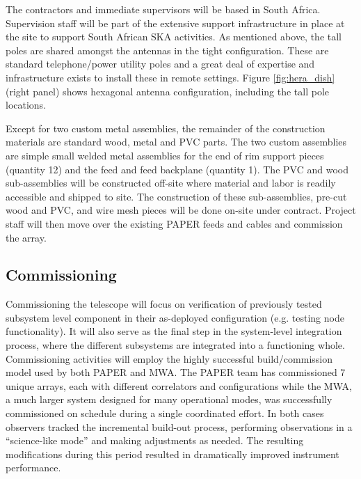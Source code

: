 \documentclass[preprint]{aastex}
\begin{document}
The contractors and immediate supervisors will be based in South Africa.  Supervision staff 
will be part of the extensive support infrastructure in place at the site to support South African SKA activities.
As mentioned above, the tall poles are shared amongst the antennas in the tight configuration.  
These are standard telephone/power 
utility poles and a great deal of  expertise and infrastructure exists to install these in remote settings.  
Figure \ref{fig:hera_dish} (right panel) shows hexagonal antenna configuration, including the tall pole locations.


Except for two custom metal assemblies, the remainder of the construction materials are standard wood, 
metal and PVC parts.  The two custom assemblies are simple small welded metal assemblies for the end of 
rim support pieces (quantity 12) and the feed and feed backplane (quantity 1).  The PVC and wood sub-assemblies 
will be constructed off-site where material and labor is readily accessible and shipped to site.  The 
construction of these sub-assemblies, pre-cut wood and PVC, and wire mesh pieces will be done on-site under 
contract.  Project staff will then move over the existing PAPER feeds and cables and commission the array.  

\vspace{-0.25in}
\subsection{Commissioning}
\vspace{-6pt}
Commissioning the telescope will focus on verification of previously tested subsystem level component in their as-deployed configuration (e.g. testing node functionality). It will also serve as the final step in the system-level integration process, where the different subsystems are integrated into a functioning whole.  Commissioning activities will employ the highly successful build/commission model used by both PAPER and MWA. The PAPER team has commissioned 7 unique arrays, each with different correlators and configurations while the MWA, a much larger system designed for many operational modes, was successfully commissioned on schedule during a single coordinated effort.
 In both cases observers tracked the incremental build-out process, performing observations in a ``science-like mode'' and making adjustments as needed. The resulting modifications during this period resulted in dramatically improved instrument performance.  
\end{document}
